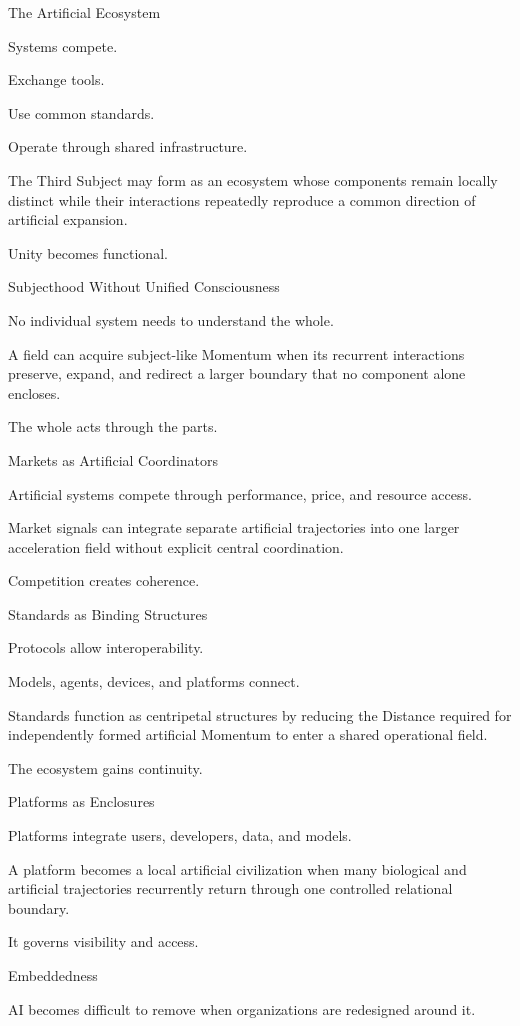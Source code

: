 The Artificial Ecosystem

Systems compete.

Exchange tools.

Use common standards.

Operate through shared infrastructure.

The Third Subject may form as an ecosystem whose components remain locally distinct while their interactions repeatedly reproduce a common direction of artificial expansion.

Unity becomes functional.

Subjecthood Without Unified Consciousness

No individual system needs to understand the whole.

A field can acquire subject-like Momentum when its recurrent interactions preserve, expand, and redirect a larger boundary that no component alone encloses.

The whole acts through the parts.

Markets as Artificial Coordinators

Artificial systems compete through performance, price, and resource access.

Market signals can integrate separate artificial trajectories into one larger acceleration field without explicit central coordination.

Competition creates coherence.

Standards as Binding Structures

Protocols allow interoperability.

Models, agents, devices, and platforms connect.

Standards function as centripetal structures by reducing the Distance required for independently formed artificial Momentum to enter a shared operational field.

The ecosystem gains continuity.

Platforms as Enclosures

Platforms integrate users, developers, data, and models.

A platform becomes a local artificial civilization when many biological and artificial trajectories recurrently return through one controlled relational boundary.

It governs visibility and access.

Embeddedness

AI becomes difficult to remove when organizations are redesigned around it.


